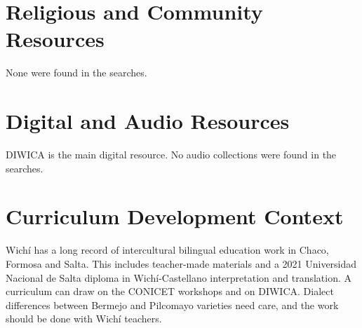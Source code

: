 \documentclass[12pt]{article}
\begin{document}
\section{Religious and Community Resources}
None were found in the searches.

\section{Digital and Audio Resources}
DIWICA is the main digital resource. No audio collections were found in the searches.

\section{Curriculum Development Context}
Wich\'i has a long record of intercultural bilingual education work in Chaco, Formosa and Salta. This includes teacher-made materials and a 2021 Universidad Nacional de Salta diploma in Wich\'i-Castellano interpretation and translation. A curriculum can draw on the CONICET workshops and on DIWICA. Dialect differences between Bermejo and Pilcomayo varieties need care, and the work should be done with Wich\'i teachers.
\end{document}
